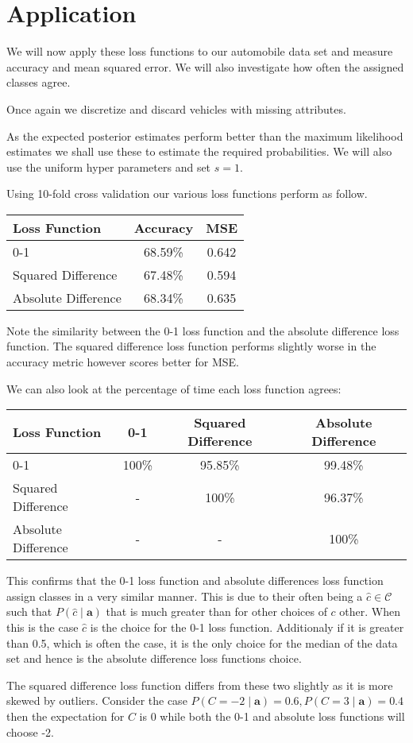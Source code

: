 \section{Application}
We will now apply these loss functions to our automobile data set and measure accuracy and mean squared error.
We will also investigate how often the assigned classes agree.

Once again we discretize and discard vehicles with missing attributes.

As the expected posterior estimates perform better than the maximum likelihood estimates we shall use these to estimate the required probabilities.
We will also use the uniform hyper parameters and set $s=1$.

Using 10-fold cross validation our various loss functions perform as follow.

\begin{center}
\begin{tabular}{l|c c}
	Loss Function       & Accuracy & MSE   \\
	\hline
	0-1                 & 68.59\%  & 0.642 \\
	Squared Difference  & 67.48\%  & 0.594 \\
	Absolute Difference & 68.34\%  & 0.635 \\
\end{tabular}
\end{center}

Note the similarity between the 0-1 loss function and the absolute difference loss function.
The squared difference loss function performs slightly worse in the accuracy metric however scores better for MSE.

We can also look at the percentage of time each loss function agrees:
\begin{center}
\begin{tabular}{l|c c c}
	Loss Function       & 0-1     & Squared Difference & Absolute Difference   \\
	\hline
	0-1                 & 100\% & 95.85\% & 99.48\% \\
	Squared Difference  & - & 100\% & 96.37\%\\
	Absolute Difference & - & - & 100\% \\
\end{tabular}
\end{center}

This confirms that the 0-1 loss function and absolute differences loss function assign classes in a very similar manner.
This is due to their often being a $\hat{c} \in \mathcal{C}$ such that $P(\hat{c} \mid \mathbf{a})$ that is much greater than for other choices of $c$ other.
When this is the case $\hat{c}$ is the choice for the 0-1 loss function.
Additionaly if it is greater than 0.5, which is often the case, it is the only choice for the median of the data set and hence is the absolute difference loss functions choice.

The squared difference loss function differs from these two slightly as it is more skewed by outliers.
Consider the case $P(C=-2\mid \mathbf{a})=0.6, P(C=3\mid \mathbf{a})=0.4$ then the expectation for $C$ is $0$ while both the 0-1 and absolute loss functions will choose -2.
